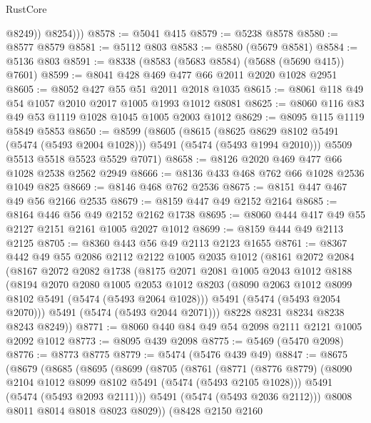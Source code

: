 \begin{lexlean}{RustCore}
\begin{coremodule}
              @8249))
          @8254)))
@8578 := @5041 @415
@8579 := @5238 @8578
@8580 := @8577 @8579
@8581 := @5112 @803
@8583 := @8580 (@5679 @8581)
@8584 := @5136 @803
@8591 := @8338 (@8583 (@5683 @8584) (@5688 (@5690 @415)) @7601)
@8599 := @8041 @428 @469 @477 @66 @2011 @2020 @1028 @2951
@8605 := @8052 @427 @55 @51 @2011 @2018 @1035
@8615 := @8061 @118 @49 @54 @1057 @2010 @2017 @1005 @1993 @1012 @8081
@8625 := @8060 @116 @83 @49 @53 @1119 @1028 @1045 @1005 @2003 @1012
@8629 := @8095 @115 @1119 @5849 @5853
@8650 := @8599
    (@8605
      (@8615
        (@8625 @8629 @8102 @5491 (@5474 (@5493 @2004 @1028)))
        @5491
        (@5474 (@5493 @1994 @2010)))
      @5509
      @5513
      @5518
      @5523
      @5529
      @7071)
@8658 := @8126 @2020 @469 @477 @66 @1028 @2538 @2562 @2949
@8666 := @8136 @433 @468 @762 @66 @1028 @2536 @1049 @825
@8669 := @8146 @468 @762 @2536
@8675 := @8151 @447 @467 @49 @56 @2166 @2535
@8679 := @8159 @447 @49 @2152 @2164
@8685 := @8164 @446 @56 @49 @2152 @2162 @1738
@8695 := @8060 @444 @417 @49 @55 @2127 @2151 @2161 @1005 @2027 @1012
@8699 := @8159 @444 @49 @2113 @2125
@8705 := @8360 @443 @56 @49 @2113 @2123 @1655
@8761 := @8367
    @442
    @49
    @55
    @2086
    @2112
    @2122
    @1005
    @2035
    @1012
    (@8161
      @2072
      @2084
      (@8167
        @2072
        @2082
        @1738
        (@8175
          @2071
          @2081
          @1005
          @2043
          @1012
          @8188
          (@8194
            @2070
            @2080
            @1005
            @2053
            @1012
            @8203
            (@8090 @2063 @1012 @8099 @8102 @5491 (@5474 (@5493 @2064 @1028)))
            @5491
            (@5474 (@5493 @2054 @2070)))
          @5491
          (@5474 (@5493 @2044 @2071)))
        @8228
        @8231
        @8234
        @8238
        @8243
        @8249))
@8771 := @8060 @440 @84 @49 @54 @2098 @2111 @2121 @1005 @2092 @1012
@8773 := @8095 @439 @2098
@8775 := @5469 (@5470 @2098)
@8776 := @8773 @8775
@8779 := @5474 (@5476 @439 @49)
@8847 := @8675
    (@8679
      (@8685
        (@8695
          (@8699
            (@8705
              (@8761
                (@8771
                  (@8776 @8779)
                  (@8090 @2104 @1012 @8099 @8102 @5491 (@5474 (@5493 @2105 @1028)))
                  @5491
                  (@5474 (@5493 @2093 @2111)))
                @5491
                (@5474 (@5493 @2036 @2112)))
              @8008
              @8011
              @8014
              @8018
              @8023
              @8029))
          (@8428
            @2150
            @2160

\end{coremodule}
\end{lexlean}
